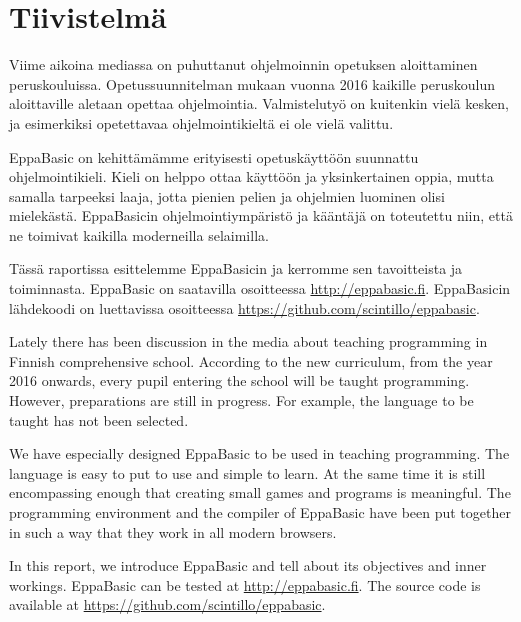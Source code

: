 
\section*{Tiivistelmä}
Viime aikoina mediassa on puhuttanut
ohjelmoinnin opetuksen aloittaminen
peruskouluissa.
Opetussuunnitelman mukaan vuonna
2016 kaikille peruskoulun aloittaville
aletaan opettaa ohjelmointia.
Valmistelutyö on kuitenkin vielä kesken,
ja esimerkiksi opetettavaa
ohjelmointikieltä ei ole vielä valittu.

EppaBasic on kehittämämme erityisesti
opetuskäyttöön suunnattu
ohjelmointikieli.
Kieli on helppo ottaa käyttöön
ja yksinkertainen oppia,
mutta samalla tarpeeksi laaja,
jotta pienien pelien ja ohjelmien
luominen olisi mielekästä.
EppaBasicin ohjelmointiympäristö ja kääntäjä
on toteutettu niin, että ne toimivat
kaikilla moderneilla selaimilla.

Tässä raportissa esittelemme EppaBasicin
ja kerromme sen tavoitteista ja toiminnasta.
EppaBasic on saatavilla osoitteessa \url{http://eppabasic.fi}.
EppaBasicin lähdekoodi on luettavissa
osoitteessa \url{https://github.com/scintillo/eppabasic}.

\vspace{50px}

Lately there has been discussion
in the media
about teaching programming in
Finnish comprehensive school.
According to the new curriculum,
from the year 2016 onwards,
every pupil entering the school
will be taught programming.
However, preparations
are still in progress.
For example, the language to
be taught has not been selected.

We have especially designed EppaBasic to be
used in teaching programming.
The language is easy to put to use
and simple to learn.
At the same time it is still
encompassing enough that
creating small games and programs
is meaningful.
The programming environment
and the compiler of EppaBasic
have been put together in such
a way that they work in all
modern browsers.

In this report, we introduce EppaBasic
and tell about its objectives and inner
workings.
EppaBasic can be tested at
\url{http://eppabasic.fi}.
The source code is available at
\url{https://github.com/scintillo/eppabasic}.